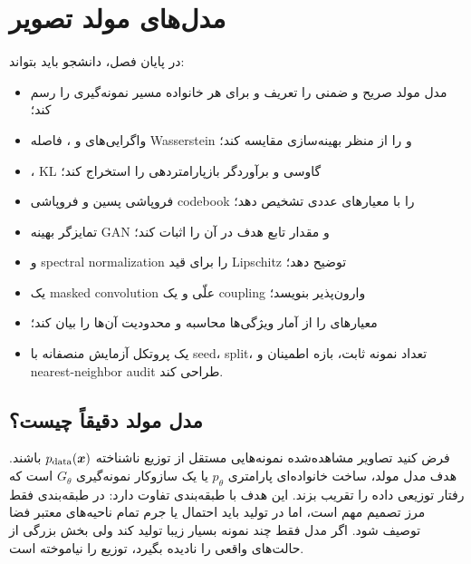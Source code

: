 \documentclass[12pt,openany,oneside]{book}
\newcommand{\vect}[1]{\bm{#1}}
\begin{document}
\tableofcontents
\mainmatter
\setcounter{chapter}{11}
\chapter{مدل‌های مولد تصویر}

\begin{learningbox}
در پایان فصل، دانشجو باید بتواند:
\begin{itemize}
\item مدل مولد صریح و ضمنی را تعریف و برای هر خانواده مسیر نمونه‌گیری را رسم کند؛
\item واگرایی‌های  و ، فاصله Wasserstein و  را از منظر بهینه‌سازی مقایسه کند؛
\item {}، KL گاوسی و برآوردگر بازپارامتردهی را استخراج کند؛
\item فروپاشی پسین و فروپاشی codebook را با معیارهای عددی تشخیص دهد؛
\item تمایزگر بهینه GAN و مقدار تابع هدف در آن را اثبات کند؛
\item {} و spectral normalization را برای قید Lipschitz توضیح دهد؛
\item یک masked convolution علّی و یک coupling وارون‌پذیر بنویسد؛
\item معیارهای  را از آمار ویژگی‌ها محاسبه و محدودیت آن‌ها را بیان کند؛
\item یک پروتکل آزمایش منصفانه با seed، split، تعداد نمونه ثابت، بازه اطمینان و nearest-neighbor audit طراحی کند.
\end{itemize}
\end{learningbox}

\section{مدل مولد دقیقاً چیست؟}
فرض کنید تصاویر مشاهده‌شده نمونه‌هایی مستقل از توزیع ناشناخته $p_{\rm data}(\vect x)$ باشند. هدف مدل مولد، ساخت
خانواده‌ای پارامتری $p_\theta$ یا یک سازوکار نمونه‌گیری $G_\theta$ است که رفتار توزیعی داده را تقریب بزند.
این هدف با طبقه‌بندی تفاوت دارد: در طبقه‌بندی فقط مرز تصمیم مهم است، اما در تولید باید احتمال یا جرم تمام ناحیه‌های
معتبر فضا توصیف شود. اگر مدل فقط چند نمونه بسیار زیبا تولید کند ولی بخش بزرگی از حالت‌های واقعی را نادیده بگیرد،
توزیع را نیاموخته است.
\end{document}

